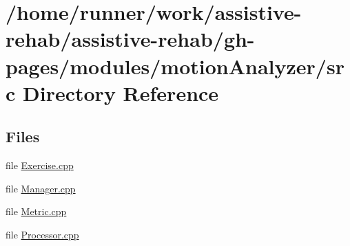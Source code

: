 \section{/home/runner/work/assistive-\/rehab/assistive-\/rehab/gh-\/pages/modules/motion\+Analyzer/src Directory Reference}
\label{dir_15bec74218e03e1a1fdceb2a93b44656}
\subsection*{Files}
\begin{DoxyCompactItemize}
\item 
file \hyperlink{Exercise_8cpp}{Exercise.\+cpp}
\item 
file \hyperlink{Manager_8cpp}{Manager.\+cpp}
\item 
file \hyperlink{Metric_8cpp}{Metric.\+cpp}
\item 
file \hyperlink{Processor_8cpp}{Processor.\+cpp}
\end{DoxyCompactItemize}
